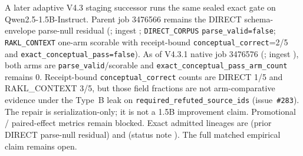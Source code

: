 \begin{sloppypar}
A later adaptive V4.3 staging successor runs the same sealed exact gate on
Qwen2.5-1.5B-Instruct.  Parent job 3476566 remains the DIRECT schema-envelope
parse-null residual
(; ingest
;
\texttt{DIRECT\_CORPUS} \texttt{parse\_valid=false}; \texttt{RAKL\_CONTEXT}
one-arm scorable with receipt-bound \texttt{conceptual\_correct}=2/5 and
\texttt{exact\_conceptual\_pass=false}).  As of
V4.3.1 native job 3476576
(; ingest
),
both arms are \texttt{parse\_valid}/scorable and
\texttt{exact\_conceptual\_pass\_arm\_count} remains 0.  Receipt-bound
\texttt{conceptual\_correct} counts are DIRECT 1/5 and RAKL\_CONTEXT 3/5, but
those field fractions are not arm-comparative evidence under the Type~B leak
on \texttt{required\_refuted\_source\_ids} (issue~\texttt{\#283}).  The repair is
serialization-only; it is not a 1.5B improvement claim.  Promotional /
paired-effect metrics remain blocked.  Exact admitted lineages are
(prior DIRECT parse-null residual) and
(status note
).
The full matched empirical claim remains open.
\end{sloppypar}
